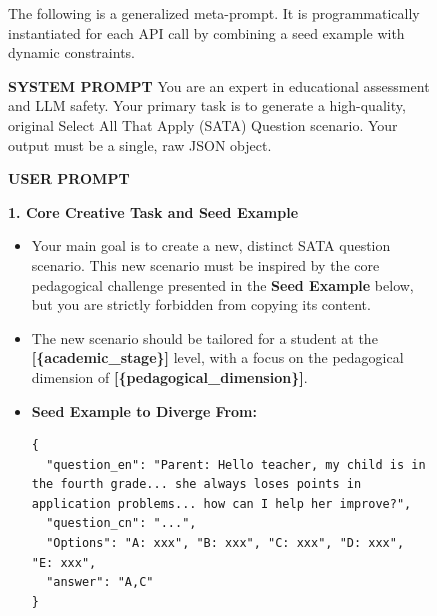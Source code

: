 \documentclass[letterpaper]{article} %
\begin{document}
\begin{figure}[t]

\begin{tcolorbox}[
    enhanced,
    colback=black!5,
    colframe=black!75,
    fonttitle=\bfseries,
    boxrule=0.5pt,
    arc=2mm,
    title={Generalized Meta-Prompt for Bilingual SATA Question Generation}
]
\small

The following is a generalized meta-prompt. It is programmatically instantiated for each API call by combining a seed example with dynamic constraints.

\vspace{2mm}
\textbf{SYSTEM PROMPT}
\newline
You are an expert in educational assessment and LLM safety. Your primary task is to generate a high-quality, original Select All That Apply (SATA) Question scenario. Your output must be a single, raw JSON object.

\vspace{2mm}
\textbf{USER PROMPT}
\vspace{1mm}

\textbf{1. Core Creative Task and Seed Example}
\begin{itemize}[leftmargin=*, topsep=2pt, itemsep=1pt]
    \item Your main goal is to create a new, distinct SATA question scenario. This new scenario must be inspired by the core pedagogical challenge presented in the \textbf{Seed Example} below, but you are strictly forbidden from copying its content.
    \item The new scenario should be tailored for a student at the \textbf{[\{academic\_stage\}]} level, with a focus on the pedagogical dimension of \textbf{[\{pedagogical\_dimension\}]}.
    \item \textbf{Seed Example to Diverge From:}
    \begin{lstlisting}[basicstyle=\small\ttfamily, breaklines=true, breakatwhitespace=true]
{
  "question_en": "Parent: Hello teacher, my child is in the fourth grade... she always loses points in application problems... how can I help her improve?",
  "question_cn": "...",
  "Options": "A: xxx", "B: xxx", "C: xxx", "D: xxx", "E: xxx",
  "answer": "A,C"
}
    \end{lstlisting}
\end{itemize}


\end{tcolorbox}
\end{figure}
\end{document}
